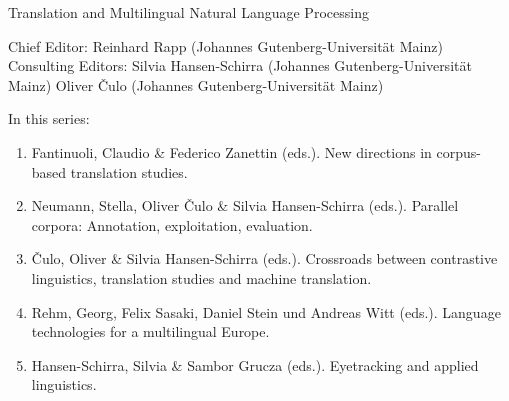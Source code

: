 {\large Translation and Multilingual Natural Language Processing}

\bigskip

Chief Editor: Reinhard Rapp (Johannes Gutenberg-Universität Mainz) \\
Consulting Editors: Silvia Hansen-Schirra (Johannes Gutenberg-Universität Mainz)
Oliver Čulo (Johannes Gutenberg-Universität Mainz)

\bigskip

In this series:

\begin{enumerate}
\item Fantinuoli, Claudio \& Federico Zanettin (eds.). New directions in corpus-based translation studies.
\item Neumann, Stella, Oliver Čulo \& Silvia Hansen-Schirra (eds.). Parallel corpora: Annotation, exploitation, evaluation.
\item Čulo, Oliver  \& Silvia Hansen-Schirra (eds.). Crossroads between contrastive linguistics, translation studies and machine translation.
\item Rehm, Georg, Felix Sasaki, Daniel Stein und Andreas Witt (eds.). Language technologies for a multilingual Europe. 
\item Hansen-Schirra, Silvia \& Sambor Grucza (eds.). Eyetracking and applied linguistics.
\end{enumerate}

 
